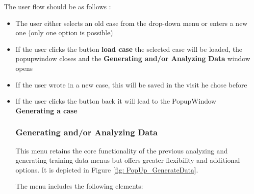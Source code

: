 \documentclass[]{scrreprt}
\begin{document}
The user flow should be as follows : \\
\begin{itemize}
    \item The user either selects an old case from the drop-down menu or enters a new one (only one option is possible)
    \item If the user clicks the button \textbf{load case} the selected case will be loaded, the popupwindow closes and the \textbf{Generating and/or Analyzing Data} window opens
    \item If the user wrote in a new case, this will be saved in the visit he chose before
    \item If the user clicks the button back it will lead to the PopupWindow \textbf{Generating a case}


\subsubsection{Generating and/or Analyzing Data}


This menu retains the core functionality of the previous analyzing and generating training data menus but offers greater flexibility and additional options. It is depicted in Figure \ref{fig: PopUp_GenerateData}.


The menu includes the following elements:



\end{itemize}
\end{document}
